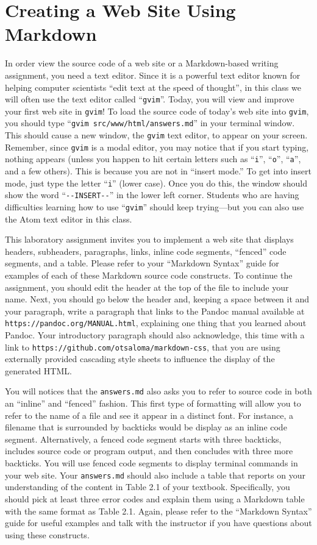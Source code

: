 \documentclass[11pt]{article}
\newcommand{\mainprogram}{\lstinline{answers.md}}
\newcommand{\command}[1]{``\lstinline{#1}''}
\newcommand{\program}[1]{\lstinline{#1}}
\newcommand{\url}[1]{\lstinline{#1}}
\begin{document}
\section*{Creating a Web Site Using Markdown}

In order view the source code of a web site or a Markdown-based writing
assignment, you need a text editor. Since it is a powerful text editor known for
helping computer scientists ``edit text at the speed of thought'', in this class
we will often use the text editor called \command{gvim}. Today, you will view
and improve your first web site in {\tt gvim}! To load the source code of
today's web site into \program{gvim}, you should type \command{gvim
src/www/html/answers.md} in your terminal window. This should cause a new
window, the \program{gvim} text editor, to appear on your screen. Remember,
since \program{gvim} is a modal editor, you may notice that if you start typing,
nothing appears (unless you happen to hit certain letters such as \command{i},
\command{o}, \command{a}, and a few others). This is because you are not in
``insert mode.'' To get into insert mode, just type the letter \command{i}
(lower case). Once you do this, the window should show the word
\command{--INSERT--} in the lower left corner. Students who are having
difficulties learning how to use \command{gvim} should keep trying---but you can
also use the Atom text editor in this class.

This laboratory assignment invites you to implement a web site that displays
headers, subheaders, paragraphs, links, inline code segments, ``fenced'' code
segments, and a table. Please refer to your ``Markdown Syntax'' guide for
examples of each of these Markdown source code constructs. To continue the
assignment, you should edit the header at the top of the file to include your
name. Next, you should go below the header and, keeping a space between it and
your paragraph, write a paragraph that links to the Pandoc manual available at
\url{https://pandoc.org/MANUAL.html}, explaining one thing that you learned
about Pandoc. Your introductory paragraph should also acknowledge, this time
with a link to \url{https://github.com/otsaloma/markdown-css}, that you are
using externally provided cascading style sheets to influence the display of the
generated HTML.

You will notices that the \mainprogram{} also asks you to refer to source code
in both an ``inline'' and ``fenced'' fashion. This first type of formatting will
allow you to refer to the name of a file and see it appear in a distinct font.
For instance, a filename that is surrounded by backticks would be display as an
inline code segment. Alternatively, a fenced code segment starts with three
backticks, includes source code or program output, and then concludes with three
more backticks. You will use fenced code segments to display terminal commands
in your web site. Your \mainprogram{} should also include a table that reports
on your understanding of the content in Table 2.1 of your textbook.
Specifically, you should pick at least three error codes and explain them using
a Markdown table with the same format as Table 2.1. Again, please refer to the
``Markdown Syntax'' guide for useful examples and talk with the instructor if
you have questions about using these constructs.
\end{document}
